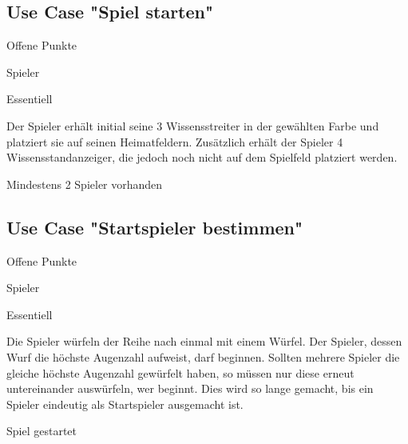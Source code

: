 \subsection{Use Case "Spiel starten"}
\begin{labeling}[:]{Offene Punkte}
\item [Akteure] Spieler
\item [Priorität] Essentiell
\item [Beschreibung] Der Spieler erhält initial seine 3 Wissensstreiter in der gewählten Farbe und platziert sie auf seinen Heimatfeldern. Zusätzlich erhält der Spieler 4 Wissensstandanzeiger, die jedoch noch nicht auf dem Spielfeld platziert werden.
\item [Vorbedigungen] Mindestens 2 Spieler vorhanden
\item [Offene Punkte]

\subsection{Use Case "Startspieler bestimmen"}
\begin{labeling}[:]{Offene Punkte}
\item [Akteure] Spieler
\item [Priorität] Essentiell
\item [Beschreibung] Die Spieler würfeln der Reihe nach einmal mit einem Würfel. Der Spieler, dessen Wurf die höchste Augenzahl aufweist, darf beginnen. Sollten mehrere Spieler die gleiche höchste Augenzahl gewürfelt haben, so müssen nur diese erneut untereinander auswürfeln, wer beginnt. Dies wird so lange gemacht, bis ein Spieler eindeutig als Startspieler ausgemacht ist.
\item [Vorbedigungen] Spiel gestartet
\item [Offene Punkte]


\end{labeling}
\end{labeling}
